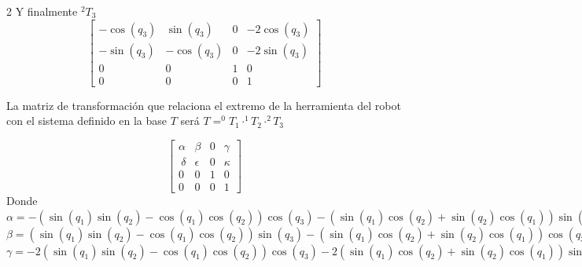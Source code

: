 \documentclass[twoside]{article}
\begin{document}
\begin{multicols}{2}
Y finalmente $^{2}T_{3}$
\begin{equation}
 \left[\begin{matrix}- \cos{\left (q_{3} \right )} & \sin{\left (q_{3} \right )} & 0 & - 2 \cos{\left (q_{3} \right )}\\- \sin{\left (q_{3} \right )} & - \cos{\left (q_{3} \right )} & 0 & - 2 \sin{\left (q_{3} \right )}\\0 & 0 & 1 & 0\\0 & 0 & 0 & 1\end{matrix}\right]
\end{equation} 

La matriz de transformación que relaciona el extremo de la herramienta del robot con el sistema definido en la base $T$ será $T = ^{0}T_{1} \cdot ^{1}T_{2} \cdot ^{2}T_{3}$

\begin{equation}
\left[\begin{matrix}\alpha & \beta & 0 & \gamma\\\ \delta & \epsilon & 0 & \kappa \\0 & 0 & 1 & 0\\0 & 0 & 0 & 1\end{matrix}\right]
\end{equation} 
Donde $\alpha=- \left(\sin{\left (q_{1} \right )} \sin{\left (q_{2} \right )} - \cos{\left (q_{1} \right )} \cos{\left (q_{2} \right )}\right) \cos{\left (q_{3} \right )} - \left(\sin{\left (q_{1} \right )} \cos{\left (q_{2} \right )} + \sin{\left (q_{2} \right )} \cos{\left (q_{1} \right )}\right) \sin{\left (q_{3} \right )}$ \\

\vspace*{1\baselineskip}
$\beta=\left(\sin{\left (q_{1} \right )} \sin{\left (q_{2} \right )} - \cos{\left (q_{1} \right )} \cos{\left (q_{2} \right )}\right) \sin{\left (q_{3} \right )} - \left(\sin{\left (q_{1} \right )} \cos{\left (q_{2} \right )} + \sin{\left (q_{2} \right )} \cos{\left (q_{1} \right )}\right) \cos{\left (q_{3} \right )}$ \\

\vspace*{1\baselineskip}
$\gamma=- 2 \left(\sin{\left (q_{1} \right )} \sin{\left (q_{2} \right )} - \cos{\left (q_{1} \right )} \cos{\left (q_{2} \right )}\right) \cos{\left (q_{3} \right )} - 2 \left(\sin{\left (q_{1} \right )} \cos{\left (q_{2} \right )} + \sin{\left (q_{2} \right )} \cos{\left (q_{1} \right )}\right) \sin{\left (q_{3} \right )} + 3 \sin{\left (q_{1} \right )} \sin{\left (q_{2} \right )} - 3 \cos{\left (q_{1} \right )} \cos{\left (q_{2} \right )} + 4 \cos{\left (q_{1} \right )}$\\


\end{multicols}
\end{document}
